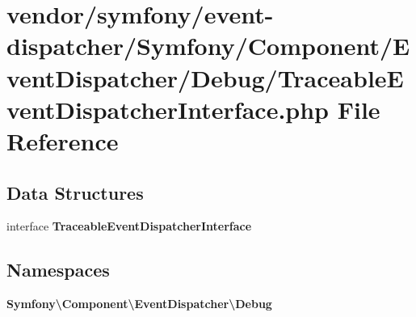 \section{vendor/symfony/event-\/dispatcher/\+Symfony/\+Component/\+Event\+Dispatcher/\+Debug/\+Traceable\+Event\+Dispatcher\+Interface.php File Reference}
\label{_traceable_event_dispatcher_interface_8php}
\subsection*{Data Structures}
\begin{DoxyCompactItemize}
\item 
interface {\bf Traceable\+Event\+Dispatcher\+Interface}
\end{DoxyCompactItemize}
\subsection*{Namespaces}
\begin{DoxyCompactItemize}
\item 
 {\bf Symfony\textbackslash{}\+Component\textbackslash{}\+Event\+Dispatcher\textbackslash{}\+Debug}
\end{DoxyCompactItemize}
